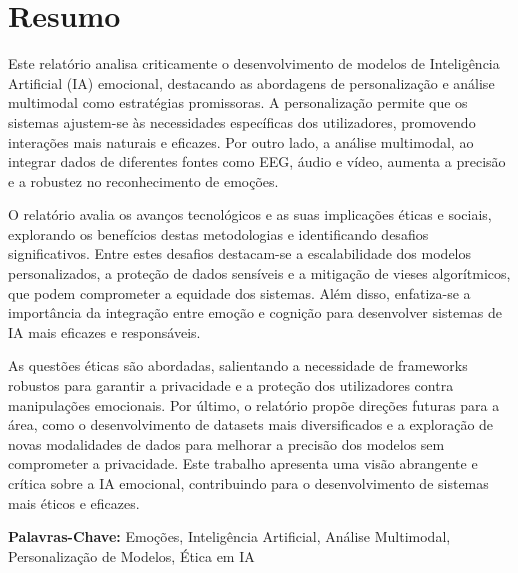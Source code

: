 \documentclass[a4paper,12pt]{report}
\begin{document}
	
	\newpage
	\thispagestyle{empty}
	\mbox{}
	\newpage
	
	
	\section*{Resumo}
	
	Este relatório analisa criticamente o desenvolvimento de modelos de Inteligência Artificial (IA) emocional, destacando as abordagens de personalização e análise multimodal como estratégias promissoras. A personalização permite que os sistemas ajustem-se às necessidades específicas dos utilizadores, promovendo interações mais naturais e eficazes. Por outro lado, a análise multimodal, ao integrar dados de diferentes fontes como EEG, áudio e vídeo, aumenta a precisão e a robustez no reconhecimento de emoções.
	
	O relatório avalia os avanços tecnológicos e as suas implicações éticas e sociais, explorando os benefícios destas metodologias e identificando desafios significativos. Entre estes desafios destacam-se a escalabilidade dos modelos personalizados, a proteção de dados sensíveis e a mitigação de vieses algorítmicos, que podem comprometer a equidade dos sistemas. Além disso, enfatiza-se a importância da integração entre emoção e cognição para desenvolver sistemas de IA mais eficazes e responsáveis.
	
	As questões éticas são abordadas, salientando a necessidade de frameworks robustos para garantir a privacidade e a proteção dos utilizadores contra manipulações emocionais. Por último, o relatório propõe direções futuras para a área, como o desenvolvimento de datasets mais diversificados e a exploração de novas modalidades de dados para melhorar a precisão dos modelos sem comprometer a privacidade. Este trabalho apresenta uma visão abrangente e crítica sobre a IA emocional, contribuindo para o desenvolvimento de sistemas mais éticos e eficazes.
	
	\vspace{4em}
	
	\noindent\textbf{Palavras-Chave:} \normalsize{Emoções, Inteligência Artificial, Análise Multimodal, Personalização de Modelos, Ética em IA}
	
	\newpage
	
	
	
\end{document}
